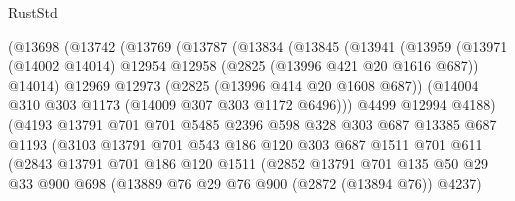 \begin{lexlean}{RustStd}
\begin{coremodule}
{\begin{coremodule}
{{{{{{{{{{{{{{{{{{{{                    (@13698
                      (@13742
                        (@13769
                          (@13787
                            (@13834
                              (@13845
                                (@13941
                                  (@13959
                                    (@13971
                                      (@14002 @14014)
                                      @12954
                                      @12958
                                      (@2825 (@13996 @421 @20 @1616 @687))
                                      @14014)
                                    @12969
                                    @12973
                                    (@2825 (@13996 @414 @20 @1608 @687))
                                    (@14004 @310 @303 @1173 (@14009 @307 @303 @1172 @6496)))
                                  @4499
                                  @12994
                                  @4188)
                                (@4193
                                  @13791
                                  @701
                                  @701
                                  @5485
                                  @2396
                                  @598
                                  @328
                                  @303
                                  @687
                                  @13385
                                  @687
                                  @1193
                                  (@3103
                                    @13791
                                    @701
                                    @543
                                    @186
                                    @120
                                    @303
                                    @687
                                    @1511
                                    @701
                                    @611
                                    (@2843
                                      @13791
                                      @701
                                      @186
                                      @120
                                      @1511
                                      (@2852
                                        @13791
                                        @701
                                        @135
                                        @50
                                        @29
                                        @33
                                        @900
                                        @698
                                        (@13889 @76 @29 @76 @900 (@2872 (@13894 @76)) @4237)
}}}}}}}}}}}}}}}}}}}}
\end{coremodule}}
\end{coremodule}
\end{lexlean}
